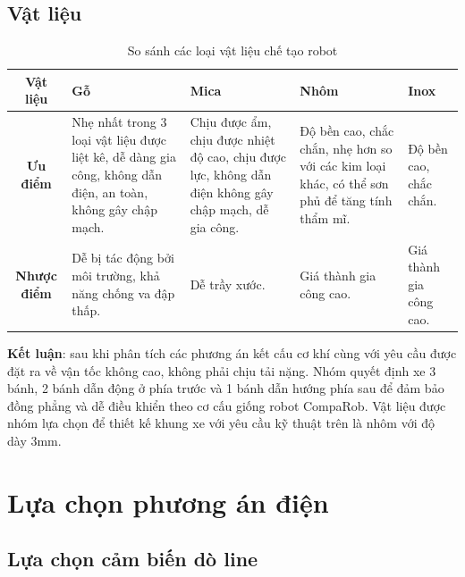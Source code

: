         \subsection{Vật liệu}
            \begin{table}[H]
                \centering
                \caption{So sánh các loại vật liệu chế tạo robot}
                \begin{tabular}{|c|p{2.8cm}|p{2.8cm}|p{2.8cm}|p{2.8cm}|}
                    \hline
                    \textbf{Vật liệu} & \textbf{Gỗ} & \textbf{Mica} & \textbf{Nhôm} & \textbf{Inox} \\
                    \hline
                    \textbf{Ưu điểm} 
                    & Nhẹ nhất trong 3 loại vật liệu được liệt kê, dễ dàng gia công, không dẫn điện, an toàn, không gây chập mạch.  
                    & Chịu được ẩm, chịu được nhiệt độ cao, chịu được lực, không dẫn điện không gây chập mạch, dễ gia công.
                    & Độ bền cao, chắc chắn, nhẹ hơn so với các kim loại khác, có thể sơn phủ để tăng tính thẩm mĩ.
                    & Độ bền cao, chắc chắn. \\
                    \hline
                    \textbf{Nhược điểm} 
                    & Dễ bị tác động bởi môi trường, khả năng chống va đập thấp.
                    & Dễ trầy xước.
                    & Giá thành gia công cao.
                    & Giá thành gia công cao. \\
                    \hline
                \end{tabular} 
                \label{tab:label}
            \end{table}
        \hspace*{0.6cm}\textbf{Kết luận}: sau khi phân tích các phương án kết cấu cơ khí cùng với yêu cầu được đặt ra về vận tốc không cao, không phải chịu tải nặng. Nhóm quyết định xe 3 bánh, 2 bánh dẫn động ở phía trước và 1 bánh dẫn hướng phía sau để đảm bảo đồng phẳng và dễ điều khiển theo cơ cấu giống robot CompaRob. Vật liệu được nhóm lựa chọn để thiết kế khung xe với yêu cầu kỹ thuật trên là nhôm với độ dày 3mm. 
    \section{Lựa chọn phương án điện}
        \subsection{Lựa chọn cảm biến dò line}
